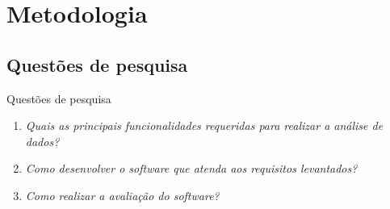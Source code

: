 

\section{Metodologia}
\label{sec:metodologia}

\subsection{Questões de pesquisa}
\label{sec:questoes-de-pesquisa}

\begin{frame}{Questões de pesquisa}
	\begin{enumerate}
		\item \textit{Quais as principais funcionalidades requeridas para realizar a análise de dados?}
		\item \textit{Como desenvolver o software que atenda aos requisitos levantados?}
		\item \textit{Como realizar a avaliação do software?}
	\end{enumerate}
\end{frame}
